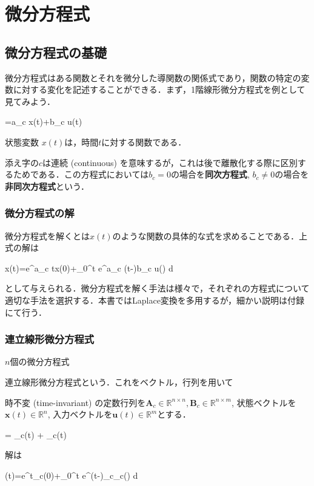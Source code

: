 \section{微分方程式}
\subsection{微分方程式の基礎}
微分方程式はある関数とそれを微分した導関数の関係式であり，関数の特定の変数に対する変化を記述することができる．まず，1階線形微分方程式を例として見てみよう．


=a_c x(t)+b_c u(t)


状態変数 $x(t)$は，時間$t$に対する関数である．

添え字の$c$は連続 (continuous) を意味するが，これは後で離散化する際に区別するためである．この方程式においては$b_c=0$の場合を\textbf{同次方程式}, $b_c\neq 0$の場合を\textbf{非同次方程式}という．

\subsubsection{微分方程式の解}
微分方程式を解くとは$x(t)$のような関数の具体的な式を求めることである．上式の解は


x(t)=e^{a_c t}x(0)+\int_0^t e^{a_c (t-\tau)}b_c u(\tau) d\tau


として与えられる．微分方程式を解く手法は様々で，それぞれの方程式について適切な手法を選択する．本書ではLaplace変換を多用するが，細かい説明は付録にて行う．

\subsubsection{連立線形微分方程式}
$n$個の微分方程式

連立線形微分方程式という．これをベクトル，行列を用いて

時不変 (time-invariant) の定数行列を$\mathbf{A}_c \in \mathbb{R}^{n\times n}, \mathbf{B}_c \in \mathbb{R}^{n\times m}$, 状態ベクトルを$\mathbf{x}(t)\in\mathbb{R}^n$, 入力ベクトルを$\mathbf{u}(t)\in\mathbb{R}^m$とする．


 = _c(t) + _c(t)


解は


(t)=e^{t_c}(0)+\int_0^t e^{(t-\tau)_c}_c(\tau) d\tau
